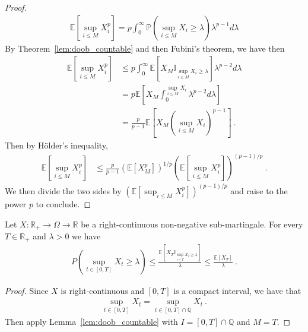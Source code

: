 \begin{proof}
\begin{align*}
  \mathbb{E}\left[ \sup_{i \le M}X_i^p \right]
  = p \int_0^\infty \mathbb{P}\left( \sup_{i \le M}X_i \geq \lambda \right) \lambda^{p-1} d\lambda
\end{align*}
By Theorem~\ref{lem:doob_countable} and then Fubini's theorem, we have then
\begin{align*}
  \mathbb{E}\left[ \sup_{i \le M}X_i^p \right]
  &\le p \int_0^\infty \mathbb{E}\left[X_M \mathbb{I}_{\sup_{i \le M}X_i \ge \lambda}\right] \lambda^{p-2} d\lambda
  \\
  &= p \mathbb{E}\left[X_M \int_0^{\sup_{i \le M}X_i} \lambda^{p-2} d\lambda\right]
  \\
  &= \frac{p}{p - 1} \mathbb{E}\left[X_M (\sup_{i \le M}X_i)^{p-1}\right]
  \: .
\end{align*}
Then by Hölder's inequality,
\begin{align*}
  \mathbb{E}\left[ \sup_{i \le M}X_i^p \right]
  &\le \frac{p}{p - 1} \left(\mathbb{E}[X_M^p]\right)^{1/p} \left(\mathbb{E}\left[\sup_{i \le M}X_i^p \right]\right)^{(p-1)/p}
  \: .
\end{align*}
We then divide the two sides by $\left(\mathbb{E}\left[\sup_{i \le M}X_i^p \right]\right)^{(p-1)/p}$ and raise to the power $p$ to conclude.
\end{proof}


\begin{theorem}\label{thm:doob_ineq}
  \leanok
  Let $X: \mathbb{R}_+ \to \Omega \to \mathbb{R}$ be a right-continuous non-negative sub-martingale.
  For every $T \in \mathbb{R}_+$ and $\lambda>0$ we have
  \begin{align*}
    P\left( \sup_{t\in[0,T]}X_t \geq \lambda \right)
    \leq \frac{\mathbb{E}[X_T \mathbb{I}_{\sup_{i \le T}X_i \ge \lambda}]}{\lambda}
    \leq \frac{\mathbb{E}[X_T]}{\lambda}
    \: .
  \end{align*}
\end{theorem}

\begin{proof}
  \leanok
Since $X$ is right-continuous and $[0,T]$ is a compact interval, we have that
\begin{align*}
  \sup_{t\in[0,T]}X_t = \sup_{t\in[0,T] \cap \mathbb{Q}}X_t
  \: .
\end{align*}
Then apply Lemma~\ref{lem:doob_countable} with $I = [0,T] \cap \mathbb{Q}$ and $M = T$.
\end{proof}


